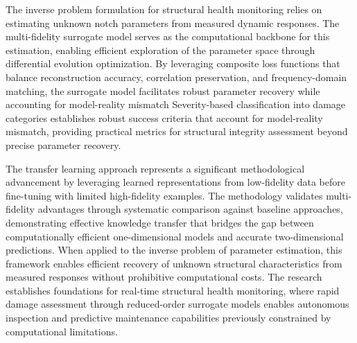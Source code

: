 \documentclass[12pt,a4paper]{report}
\begin{document}
The inverse problem formulation for structural health monitoring relies on estimating unknown notch parameters from measured dynamic responses. The multi-fidelity surrogate model serves as the computational backbone for this estimation, enabling efficient exploration of the parameter space through differential evolution optimization. By leveraging composite loss functions that balance reconstruction accuracy, correlation preservation, and frequency-domain matching, the surrogate model facilitates robust parameter recovery while accounting for model-reality mismatch Severity-based classification into damage categories establishes robust success criteria that account for model-reality mismatch, providing practical metrics for structural integrity assessment beyond precise parameter recovery.

The transfer learning approach represents a significant methodological advancement by leveraging learned representations from low-fidelity data before fine-tuning with limited high-fidelity examples. The methodology validates multi-fidelity advantages through systematic comparison against baseline approaches, demonstrating effective knowledge transfer that bridges the gap between computationally efficient one-dimensional models and accurate two-dimensional predictions. When applied to the inverse problem of parameter estimation, this framework enables efficient recovery of unknown structural characteristics from measured responses without prohibitive computational costs. The research establishes foundations for real-time structural health monitoring, where rapid damage assessment through reduced-order surrogate models enables autonomous inspection and predictive maintenance capabilities previously constrained by computational limitations.
\end{document}
